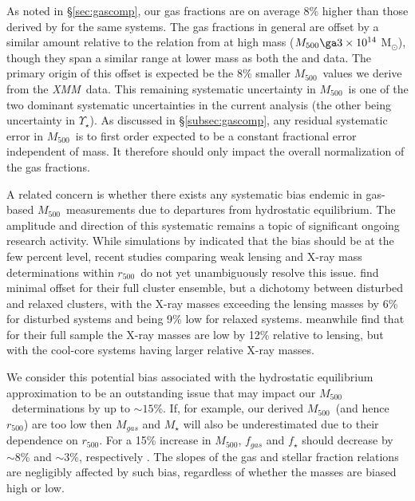 \documentclass[preprint]{emulateapj}
\newcommand{\msun}{M$_\odot$}
\newcommand\rfive{$r_{500}$}
\newcommand\mfive{${M}_{500}$}
\newcommand{\xmm}{\textit{XMM}}
\newcommand{\mlrat}{$\Upsilon_\star$}
\begin{document}
As noted in \S \ref{sec:gascomp}, our gas fractions are on average 8\%
higher than those derived by \citet{vikhlinin2006} for the same
systems. The gas fractions in general are offset by a similar amount
relative to the relation from \citet{vikhlinin2009} at high mass
($M_{500}\ga3\times10^{14}$ \msun), though they span a similar range
at lower mass as both the \citet{vikhlinin2009} and \citet{sun2009}
data.  The primary origin of this offset is expected be the 8\%
smaller \mfive\ values we derive from the \xmm\ data.  This remaining
systematic uncertainty in \mfive\ is one of the two dominant
systematic uncertainties in the current analysis (the other being
uncertainty in \mlrat).  As discussed in \S \ref{subsec:gascomp}, any
residual systematic error in \mfive\ is to first order expected to be
a constant fractional error independent of mass. It therefore should
only impact the overall normalization of the gas fractions.

A related concern is whether there exists any systematic bias endemic
in gas-based \mfive\ measurements due to departures from hydrostatic
equilibrium. The amplitude and direction of this systematic remains a
topic of significant ongoing research activity. While simulations by
\citet{lau2013} indicated that the bias should be at the few percent
level, recent studies comparing weak lensing and X-ray mass
determinations within \rfive\ do not yet unambiguously resolve this
issue. \citet{zhang2010} find minimal offset for their full cluster
ensemble, but a dichotomy between disturbed and relaxed clusters, with
the X-ray masses exceeding the lensing masses by 6\% for disturbed
systems and being 9\% low for relaxed systems. \citep{mahdavi2013}
meanwhile find that for their full sample the X-ray masses are low by
12\% relative to lensing, but with the cool-core systems having larger
relative X-ray masses.

We consider this potential bias associated with the hydrostatic
equilibrium approximation to be an outstanding issue that may impact
our \mfive\ determinations by up to $\sim15$\%. If, for example, our
derived \mfive\ (and hence \rfive) are too low then $M_{gas}$ and
$M_\star$ will also be underestimated due to their dependence on
\rfive.  For a 15\% increase in \mfive, $f_{gas}$ and $f_{\star}$
should decrease by $\sim8$\% and $\sim3$\%, respectively
\citep[c.f.][]{sanderson2013}.  The slopes of the gas and stellar
fraction relations are negligibly affected by such bias, regardless of
whether the masses are biased high or low.
\end{document}
